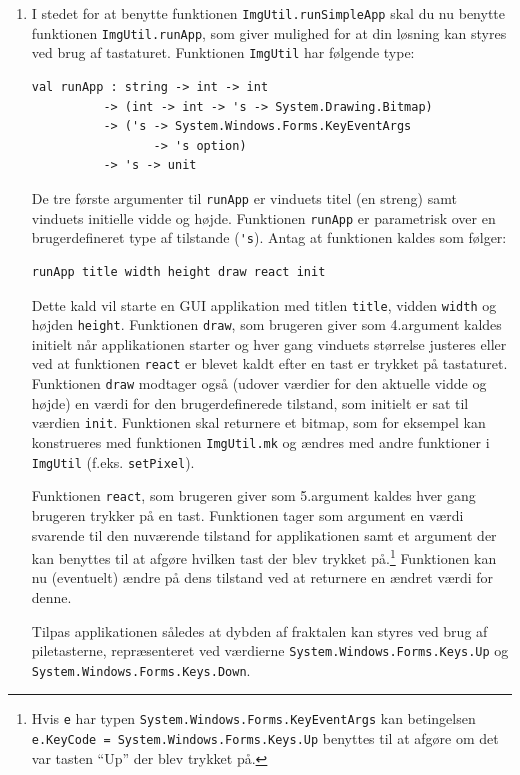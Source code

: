 \documentclass[a4paper,12pt]{article}
\begin{document}
\begin{enumerate}[label=7ø.\arabic*,start=0]
\item\label{sierpinskikeys.ov} I stedet for at benytte funktionen
  \lstinline{ImgUtil.runSimpleApp} skal du nu benytte funktionen
  \lstinline{ImgUtil.runApp}, som giver mulighed for at din løsning
  kan styres ved brug af tastaturet. Funktionen \lstinline{ImgUtil} har følgende type:
\begin{footnotesize}
\begin{lstlisting}[numbers=none,frame=none,mathescape]
val runApp : string -> int -> int
          -> (int -> int -> 's -> System.Drawing.Bitmap)
          -> ('s -> System.Windows.Forms.KeyEventArgs
                 -> 's option)
          -> 's -> unit
\end{lstlisting}
\end{footnotesize}
De tre første argumenter til \lstinline{runApp} er vinduets titel (en
streng) samt vinduets initielle vidde og højde. Funktionen
\lstinline{runApp} er parametrisk over en brugerdefineret type af tilstande (\lstinline{'s}). Antag at funktionen kaldes som følger:
\begin{footnotesize}
\begin{lstlisting}[numbers=none,frame=none,mathescape]
  runApp title width height draw react init
\end{lstlisting}
\end{footnotesize}
Dette kald vil starte en GUI applikation med titlen \lstinline{title},
vidden \lstinline{width} og højden \lstinline{height}. Funktionen
\lstinline{draw}, som brugeren giver som 4.\@ argument kaldes initielt
når applikationen starter og hver gang vinduets størrelse justeres
eller ved at funktionen \lstinline{react} er blevet kaldt efter en
tast er trykket på tastaturet. Funktionen \lstinline{draw} modtager
også (udover værdier for den aktuelle vidde og højde) en værdi for den
brugerdefinerede tilstand, som initielt er sat til værdien
\lstinline{init}. Funktionen skal returnere et bitmap, som for
eksempel kan konstrueres med funktionen \lstinline{ImgUtil.mk} og
ændres med andre funktioner i \lstinline{ImgUtil}
(f.eks. \lstinline{setPixel}).

Funktionen \lstinline{react}, som brugeren giver som 5.\@ argument
kaldes hver gang brugeren trykker på en tast. Funktionen tager som
argument en værdi svarende til den nuværende tilstand for
applikationen samt et argument der kan benyttes til at afgøre hvilken
tast der blev trykket på.\footnote{Hvis \lstinline{e} har typen
  \lstinline{System.Windows.Forms.KeyEventArgs} kan betingelsen
  \lstinline{e.KeyCode = System.Windows.Forms.Keys.Up} benyttes til at
  afgøre om det var tasten ``Up'' der blev trykket på.} Funktionen kan
nu (eventuelt) ændre på dens tilstand ved at returnere en ændret værdi
for denne.

Tilpas applikationen således at dybden af
fraktalen kan styres ved brug af piletasterne, repræsenteret ved værdierne
\lstinline{System.Windows.Forms.Keys.Up} og
\lstinline{System.Windows.Forms.Keys.Down}.
\end{enumerate}
\end{document}
